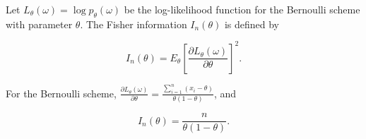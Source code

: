 Let $L_\theta(\omega) = \log p_\theta(\omega)$ be the log-likelihood function for the Bernoulli scheme with parameter $\theta$. The Fisher information $I_n(\theta)$ is defined by

$$I_n(\theta) = E_\theta \left[ \frac{\partial L_\theta(\omega)}{\partial \theta} \right]^2.$$

For the Bernoulli scheme, $\frac{\partial L_\theta(\omega)}{\partial \theta} = \frac{\sum_{i=1}^n (x_i - \theta)}{\theta(1 - \theta)}$, and

$$I_n(\theta) = \frac{n}{\theta(1 - \theta)}.$$
